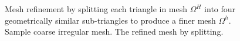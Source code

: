 \begin{figure}
	\caption[Mesh refinement by splitting.]{\protect{} Mesh refinement by splitting each triangle in mesh $\Omega^H$ into four geometrically similar sub-triangles to produce a finer mesh $\Omega^h$. \protect{} Sample coarse irregular mesh.  \protect{} The refined mesh by splitting.}
	\label{fig:LSM}
\end{figure}

